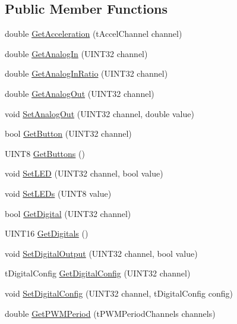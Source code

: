 \subsection*{Public Member Functions}
\begin{DoxyCompactItemize}
\item 
double \hyperlink{classDriverStationEnhancedIO_a594f2ddea855e046abcf50406542a4ca}{GetAcceleration} (tAccelChannel channel)
\item 
double \hyperlink{classDriverStationEnhancedIO_a8a4d31fb1c8845f33de2da37c559f016}{GetAnalogIn} (UINT32 channel)
\item 
double \hyperlink{classDriverStationEnhancedIO_a37c9af7405e84233c47a708be5a3c53a}{GetAnalogInRatio} (UINT32 channel)
\item 
double \hyperlink{classDriverStationEnhancedIO_a7cefa1bbdd5c1b7520e0268a17bd75db}{GetAnalogOut} (UINT32 channel)
\item 
void \hyperlink{classDriverStationEnhancedIO_ab6888ed427c283821a7b6e7e728486bc}{SetAnalogOut} (UINT32 channel, double value)
\item 
bool \hyperlink{classDriverStationEnhancedIO_a8fe07c23d485a9dac1b9821583c539b6}{GetButton} (UINT32 channel)
\item 
UINT8 \hyperlink{classDriverStationEnhancedIO_a04ed7d81517bc526ef6897a006bd3782}{GetButtons} ()
\item 
void \hyperlink{classDriverStationEnhancedIO_a34d6429692d4a27bc384533319e4127b}{SetLED} (UINT32 channel, bool value)
\item 
void \hyperlink{classDriverStationEnhancedIO_a476ebdc37d1dd1fa58ab0a0ec09c1c17}{SetLEDs} (UINT8 value)
\item 
bool \hyperlink{classDriverStationEnhancedIO_ae7cf63b5f341ddb29b9e3ef988374747}{GetDigital} (UINT32 channel)
\item 
UINT16 \hyperlink{classDriverStationEnhancedIO_a052a9491d9661576d66896a4658e1509}{GetDigitals} ()
\item 
void \hyperlink{classDriverStationEnhancedIO_a1b17805cb755900f4bc9f34f1444d822}{SetDigitalOutput} (UINT32 channel, bool value)
\item 
tDigitalConfig \hyperlink{classDriverStationEnhancedIO_a8f5de58215d255e84e48723fda4e4c5e}{GetDigitalConfig} (UINT32 channel)
\item 
void \hyperlink{classDriverStationEnhancedIO_afad555dfa62bf621e92edda0b36613d0}{SetDigitalConfig} (UINT32 channel, tDigitalConfig config)
\item 
double \hyperlink{classDriverStationEnhancedIO_a4cd8909d9a276724787ea5ec0f954c66}{GetPWMPeriod} (tPWMPeriodChannels channels)

\end{DoxyCompactItemize}
